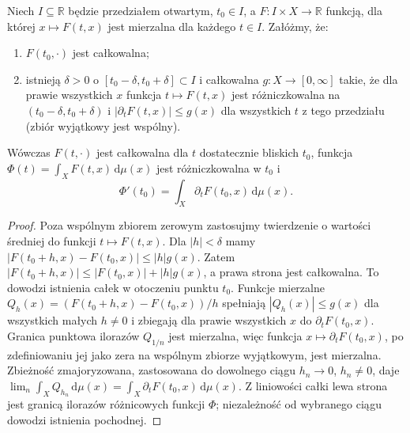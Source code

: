 \begin{twierdzenie}
\label{thm:differentiating-integrals}
Niech $I\subseteq\mathbb R$ będzie przedziałem otwartym,
$t_0\in I$, a $F:I\times X\to\mathbb R$ funkcją,
dla której $x\mapsto F(t,x)$ jest mierzalna
dla każdego $t\in I$. Załóżmy, że:
\begin{enumerate}[label=\textup{(\roman*)}]
\item $F(t_0,\cdot)$ jest całkowalna;
\item istnieją $\delta>0$ o
$[t_0-\delta,t_0+\delta]\subset I$ i całkowalna
$g:X\to[0,\infty]$ takie, że dla prawie wszystkich
$x$ funkcja $t\mapsto F(t,x)$ jest różniczkowalna
na $(t_0-\delta,t_0+\delta)$ i
$|\partial_tF(t,x)|\le g(x)$ dla wszystkich $t$ z
tego przedziału (zbiór wyjątkowy jest wspólny).
\end{enumerate}
Wówczas $F(t,\cdot)$ jest całkowalna dla
$t$ dostatecznie bliskich $t_0$, funkcja
$\Phi(t)=\int_XF(t,x)\,\mathrm d\mu(x)$ jest
różniczkowalna w $t_0$ i
\begin{equation}\label{eq:differentiation-under-integral}
\Phi'(t_0)=\int_X\partial_tF(t_0,x)\,\mathrm d\mu(x).
\end{equation}
\end{twierdzenie}
\begin{proof}
Poza wspólnym zbiorem zerowym zastosujmy twierdzenie
o wartości średniej do funkcji $t\mapsto F(t,x)$.
Dla $|h|<\delta$ mamy
$|F(t_0+h,x)-F(t_0,x)|\le |h|g(x)$.
Zatem $|F(t_0+h,x)|\le|F(t_0,x)|+|h|g(x)$,
a prawa strona jest całkowalna. To dowodzi
istnienia całek w otoczeniu punktu $t_0$.
Funkcje mierzalne
$Q_h(x)=(F(t_0+h,x)-F(t_0,x))/h$ spełniają
$|Q_h(x)|\le g(x)$ dla wszystkich małych $h\ne0$
i zbiegają dla prawie wszystkich $x$ do
$\partial_tF(t_0,x)$. Granica punktowa ilorazów $Q_{1/n}$ jest mierzalna,
więc funkcja $x\mapsto\partial_tF(t_0,x)$,
po zdefiniowaniu jej jako zera na wspólnym zbiorze
wyjątkowym, jest mierzalna. Zbieżność zmajoryzowana,
zastosowana do dowolnego ciągu $h_n\to0$,
$h_n\ne0$, daje
$\lim_n\int_XQ_{h_n}\,\mathrm d\mu(x)
=\int_X\partial_tF(t_0,x)\,\mathrm d\mu(x)$.
Z liniowości całki lewa strona jest granicą
ilorazów różnicowych funkcji $\Phi$; niezależność
od wybranego ciągu dowodzi istnienia pochodnej.
\end{proof}

